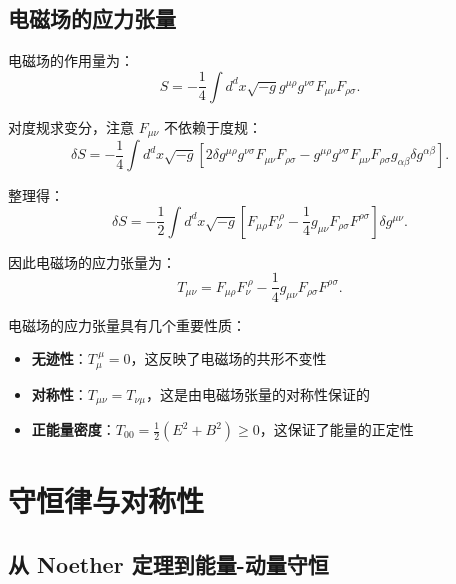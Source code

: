 \subsection{电磁场的应力张量}

\begin{example}[电磁场的应力张量]
电磁场的作用量为：
\begin{equation}
    S = -\frac{1}{4} \int d^d x \sqrt{-g} g^{\mu\rho} g^{\nu\sigma} F_{\mu\nu} F_{\rho\sigma}.
\end{equation}

对度规求变分，注意 $F_{\mu\nu}$ 不依赖于度规：
\begin{equation}
    \delta S = -\frac{1}{4} \int d^d x \sqrt{-g} \left[2 \delta g^{\mu\rho} g^{\nu\sigma} F_{\mu\nu} F_{\rho\sigma} - g^{\mu\rho} g^{\nu\sigma} F_{\mu\nu} F_{\rho\sigma} g_{\alpha\beta} \delta g^{\alpha\beta}\right].
\end{equation}

整理得：
\begin{equation}
    \delta S = -\frac{1}{2} \int d^d x \sqrt{-g} \left[F_{\mu\rho} F_\nu^{~\rho} - \frac{1}{4} g_{\mu\nu} F_{\rho\sigma} F^{\rho\sigma}\right] \delta g^{\mu\nu}.
\end{equation}

因此电磁场的应力张量为：
\begin{equation}
    T_{\mu\nu} = F_{\mu\rho} F_\nu^{~\rho} - \frac{1}{4} g_{\mu\nu} F_{\rho\sigma} F^{\rho\sigma}.
\end{equation}
\end{example}

\begin{note}[电磁场应力张量的性质]
电磁场的应力张量具有几个重要性质：
\begin{itemize}
    \item \textbf{无迹性}：$T_\mu^{~\mu} = 0$，这反映了电磁场的共形不变性
    \item \textbf{对称性}：$T_{\mu\nu} = T_{\nu\mu}$，这是由电磁场张量的对称性保证的
    \item \textbf{正能量密度}：$T_{00} = \frac{1}{2}(E^2 + B^2) \geq 0$，这保证了能量的正定性
\end{itemize}
\end{note}

\section{守恒律与对称性}

\subsection{从 Noether 定理到能量-动量守恒}

